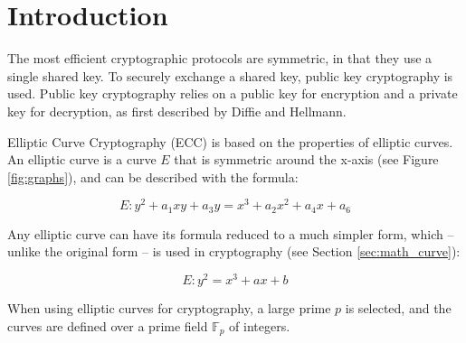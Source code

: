 \section{Introduction}

The most efficient cryptographic protocols are symmetric, in that they use a single shared key.
To securely exchange a shared key, public key cryptography is used. Public key cryptography
relies on a public key for encryption and a private key for decryption, as first described by
Diffie and Hellmann.

Elliptic Curve Cryptography (ECC) is based on the properties of elliptic curves.
An elliptic curve is a curve \(E\) that is symmetric around the x-axis (see Figure \ref{fig:graphs}),
and can be described with the formula:

\begin{equation} \label{eq:elliptic-curve-formula-full}
	E: y^2 + a_1xy + a_3y = x^3 + a_2x^2 + a_4x + a_6
\end{equation}

Any elliptic curve can have its formula reduced to a much simpler form, which -- unlike the original
form -- is used in cryptography (see Section \ref{sec:math_curve}):

\begin{equation}
	E: y^2 = x^3 + ax + b
\end{equation}

When using elliptic curves for cryptography, a large prime \(p\) is selected, and the curves are defined
over a prime field \(\mathbb{F}_p\) of integers.

